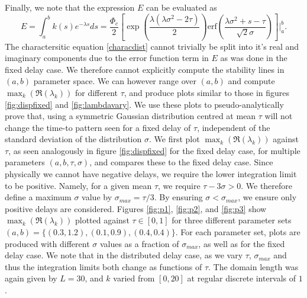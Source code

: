 Finally, we note that the expression $E$ can be evaluated as
\begin{equation}
E=\int_a^bk(s)e^{-\lambda s}ds=\frac{\Phi_c}{2}\left[\exp\left(\frac{\lambda(\lambda\sigma^2-2\tau)}{2}\right) \text{erf} \left(\frac{\lambda\sigma^2+s-\tau}{\sqrt{2}\sigma}\right)\right]\Bigg|_a^b.
\end{equation}
The charactersitic equation \eqref{characdist} cannot trivially be split into it's real and imaginary components due to the error function term in $E$ as was done in the fixed delay case. We therefore cannot explicitly compute the stability lines in $(a,b)$ parameter space. We can however range over $(a,b)$ and compute $\max_k(\Re(\lambda_k))$ for different $\tau$, and produce plots similar to those in figures \ref{fig:dispfixed} and \ref{fig:lambdavary}. We use these plots to pseudo-analytically prove that, using a symmetric Gaussian distribution centred at mean $\tau$ will not change the time-to pattern seen for a fixed delay of $\tau$, independent of the standard deviation of the distribution $\sigma$. We first plot $\max_k(\Re(\lambda_k))$ against $\tau$, as seen analogously in figure \ref{fig:dispfixed} for the fixed delay case, for multiple parameters $(a,b,\tau,\sigma)$, and compares these to the fixed delay case. Since physically we cannot have negative delays, we require the lower integration limit to be positive. Namely, for a given mean $\tau$, we require $\tau-3\sigma>0$. We therefore define a maximum $\sigma$ value by $\sigma_{max}=\tau / 3$. By ensuring $\sigma<\sigma_{max}$, we ensure only positive delays are considered. Figures \ref{fig:p1}, \ref{fig:p2}, and \ref{fig:p3} show $\max_k(\Re(\lambda_k))$ plotted against $\tau\in[0,1]$ for three different parameter sets $(a,b)=\{(0.3,1.2), (0.1,0.9), (0.4,0.4)\}$. For each parameter set, plots are produced with different $\sigma$ values as a fraction of $\sigma_{max}$, as well as for the fixed delay case. We note that in the distributed delay case, as we vary $\tau$, $\sigma_{max}$ and thus the integration limits both change as functions of $\tau$. The domain length was again given by $L=30$, and $k$ varied from $[0,20]$ at regular discrete intervals of $1$.

